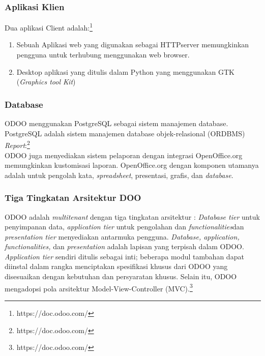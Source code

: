 \subsubsection{Aplikasi Klien}
Dua aplikasi Client adalah:\footnote{https://doc.odoo.com/}
\begin{enumerate}
	\item Sebuah Aplikasi web yang digunakan sebagai HTTPserver memungkinkan pengguna untuk terhubung menggunakan web browser.  
	\item Desktop aplikasi yang ditulis dalam Python yang menggunakan GTK (\textit{Graphics tool Kit})
\end{enumerate}

\subsubsection{Database} 
ODOO menggunakan PostgreSQL sebagai sistem manajemen database. PostgreSQL adalah sistem manajemen database objek-relasional (ORDBMS)\\ 
\textit{Report}:\footnote{https://doc.odoo.com/} \\
ODOO juga menyediakan sistem pelaporan dengan integrasi OpenOffice.org memungkinkan kustomisasi laporan. 
OpenOffice.org dengan komponen utamanya adalah untuk pengolah kata, \textit{spreadsheet}, presentasi, grafis, dan \textit{database}.

\subsubsection{Tiga Tingkatan Arsitektur DOO}
ODOO adalah \textit{multitenant} dengan tiga tingkatan arsitektur : \textit{Database tier} untuk penyimpanan data, \textit{application tier} untuk pengolahan dan \textit{functionalities}dan \textit{presentation tier} menyediakan antarmuka pengguna. \textit{Database, application, functionalities,} dan \textit{presentation} adalah lapisan yang terpisah dalam ODOO. \textit{Application tier} sendiri ditulis sebagai inti; beberapa modul tambahan dapat diinstal dalam rangka menciptakan spesifikasi khusus dari ODOO yang disesuaikan dengan kebutuhan dan persyaratan khusus. Selain itu, ODOO mengadopsi pola arsitektur Model-View-Controller (MVC).\footnote{https://doc.odoo.com/}

